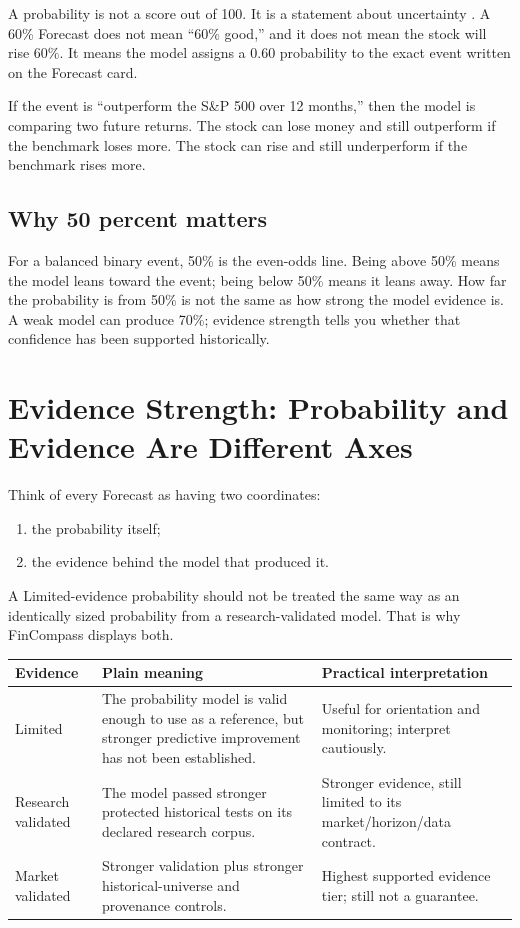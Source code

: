 \documentclass[11pt]{article}
\begin{document}
A probability is not a score out of 100. It is a statement about uncertainty \citep{gneiting2007calibration,gneiting2007proper}. A 60\% Forecast does not mean ``60\% good,'' and it does not mean the stock will rise 60\%. It means the model assigns a 0.60 probability to the exact event written on the Forecast card.

If the event is ``outperform the S\&P 500 over 12 months,'' then the model is comparing two future returns. The stock can lose money and still outperform if the benchmark loses more. The stock can rise and still underperform if the benchmark rises more.

\subsection{Why 50 percent matters}
For a balanced binary event, 50\% is the even-odds line. Being above 50\% means the model leans toward the event; being below 50\% means it leans away. How far the probability is from 50\% is not the same as how strong the model evidence is. A weak model can produce 70\%; evidence strength tells you whether that confidence has been supported historically.

\section{Evidence Strength: Probability and Evidence Are Different Axes}
Think of every Forecast as having two coordinates:
\begin{enumerate}[itemsep=0.2em]
\item the probability itself;
\item the evidence behind the model that produced it.
\end{enumerate}
A Limited-evidence probability should not be treated the same way as an identically sized probability from a research-validated model. That is why FinCompass displays both.

\begin{longtable}{p{}p{}p{}}
\toprule
Evidence & Plain meaning & Practical interpretation\\
\midrule
Limited & The probability model is valid enough to use as a reference, but stronger predictive improvement has not been established. & Useful for orientation and monitoring; interpret cautiously.\\
Research validated & The model passed stronger protected historical tests on its declared research corpus. & Stronger evidence, still limited to its market/horizon/data contract.\\
Market validated & Stronger validation plus stronger historical-universe and provenance controls. & Highest supported evidence tier; still not a guarantee.\\
\bottomrule
\end{longtable}
\end{document}
